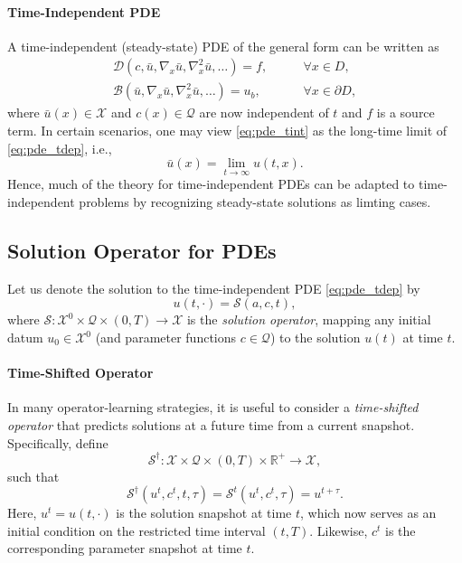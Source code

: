 \documentclass[reqno,10pt]{amsart}
\theoremstyle{plain}
\theoremstyle{definition}
\newcommand{\bb}[1]{\mathbb{#1}}
\newcommand{\cal}[1]{\mathcal{#1}}
\begin{document}
\paragraph{\bf Time-Independent PDE} A time-independent (steady-state) PDE of the general form can be written as
\begin{equation}
    \begin{aligned} \label{eq:pde_tint}
        \cal D(c,\bar{u}, \nabla_x\bar{u},\nabla^2_x\bar{u},\dots) = f, \qquad &\forall x \in D,\\
        \cal B(\bar{u},\nabla_x\bar{u},\nabla^2_x\bar{u},\dots) = u_b, \qquad &\forall x\in\partial D,
    \end{aligned}
\end{equation}
where $\bar{u}(x) \in \cal X$ and $c(x) \in \cal Q$ are now independent of $t$ and $f$ is a source term. In certain scenarios, one may view \ref{eq:pde_tint} as the long-time limit of \ref{eq:pde_tdep}, i.e.,
\begin{equation}
    \bar{u}(x) = \lim_{t\to \infty} u(t,x).
\end{equation}
Hence, much of the theory for time-independent PDEs can be adapted to time-independent problems by recognizing steady-state solutions as limting cases.

\subsection{\bf Solution Operator for PDEs}
Let us denote the solution to the time-independent PDE \ref{eq:pde_tdep} by
\begin{equation}
    u(t,\cdot) = \cal S(a,c,t),
\end{equation}
where $\cal S: \cal X^0 \times \cal Q\times (0,T) \to \cal X$ is the {\it solution operator}, mapping any initial datum $u_0 \in \cal X^0$ (and parameter functions $c\in \cal Q$) to the solution $u(t)$ at time $t$.

\paragraph{\bf Time-Shifted Operator} In many operator-learning strategies, it is useful to consider a {\it time-shifted operator} that predicts solutions at a future time from a current snapshot. Specifically, define
\begin{equation}
    \cal S^\dag : \cal X \times \cal Q \times (0,T) \times \bb R^+ \to \cal X,
\end{equation}
such that
\begin{equation}
    \cal S^\dag(u^t, c^t,t,\tau) = \cal S^t(u^t, c^t, \tau) = u^{t+\tau}.
\end{equation}
Here, $u^t= u(t,\cdot)$ is the solution snapshot at time $t$, which now serves as an initial condition on the restricted time interval $(t,T)$. Likewise, $c^t$ is the corresponding parameter snapshot at time $t$.
\end{document}
